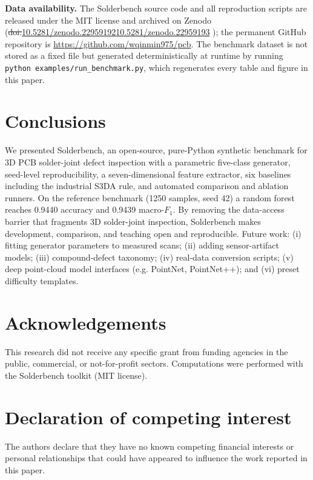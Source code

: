 \documentclass[3p]{elsarticle}
\makeatletter
\providecommand{\DIFaddtex}[1]{{\protect\color{blue}\uwave{#1}}} %
\providecommand{\DIFdeltex}[1]{{\protect\color{red}\sout{#1}}} %
\providecommand{\DIFaddbegin}{} %
\providecommand{\DIFaddend}{} %
\providecommand{\DIFdelbegin}{} %
\providecommand{\DIFdelend}{} %
\providecommand{\DIFadd}[1]{\texorpdfstring{\DIFaddtex{#1}}{#1}} %
\providecommand{\DIFdel}[1]{\texorpdfstring{\DIFdeltex{#1}}{}} %
\providecommand{\DIFscaledelfig}{0.5}
\newlength{\DIFdelgraphicswidth} %
\newlength{\DIFdelgraphicsheight} %
\providecommand{\DIFaddincludegraphics}[2][]{{\color{blue}\fbox{\DIFOincludegraphics[#1]{#2}}}} %
\providecommand{\DIFdelincludegraphics}[2][]{%
\sbox{\DIFdelgraphicsbox}{\DIFOincludegraphics[#1]{#2}}%
\settoboxwidth{\DIFdelgraphicswidth}{\DIFdelgraphicsbox} %
\settoboxtotalheight{\DIFdelgraphicsheight}{\DIFdelgraphicsbox} %
\scalebox{\DIFscaledelfig}{%
\parbox[b]{\DIFdelgraphicswidth}{\usebox{\DIFdelgraphicsbox}\\[-\baselineskip] \rule{\DIFdelgraphicswidth}{0em}}\llap{\resizebox{\DIFdelgraphicswidth}{\DIFdelgraphicsheight}{%
\setlength{\unitlength}{\DIFdelgraphicswidth}%
\begin{picture}(1,1)%
\thicklines\linethickness{2pt} %
{\color[rgb]{1,0,0}\put(0,0){\framebox(1,1){}}}%
{\color[rgb]{1,0,0}\put(0,0){\line( 1,1){1}}}%
{\color[rgb]{1,0,0}\put(0,1){\line(1,-1){1}}}%
\end{picture}%
}\hspace*{3pt}}} %
} %
\DeclareRobustCommand{\DIFaddbegin}{\DIFOaddbegin \let\includegraphics\DIFaddincludegraphics} %
\DeclareRobustCommand{\DIFaddend}{\DIFOaddend \let\includegraphics\DIFOincludegraphics} %
\DeclareRobustCommand{\DIFdelbegin}{\DIFOdelbegin \let\includegraphics\DIFdelincludegraphics} %
\DeclareRobustCommand{\DIFdelend}{\DIFOaddend \let\includegraphics\DIFOincludegraphics} %
\let\sout@orig\sout %
\renewcommand{\sout}[1]{\ifmmode\text{\sout@orig{\ensuremath{#1}}}\else\sout@orig{#1}\fi} %
\makeatother
\begin{document}
\begin{sloppypar}\noindent\textbf{Data availability.} The Solderbench source code and all reproduction scripts are released under the MIT license and archived on Zenodo (\DIFdelbegin \DIFdel{doi:}\DIFdelend \DIFaddbegin \DIFadd{concept doi:}\url{10.5281/zenodo.22959192}\DIFadd{, version doi:}\DIFaddend \url{10.5281/zenodo.22959193} \DIFaddbegin \DIFadd{for v0.1.1}\DIFaddend ); the permanent GitHub repository is \url{https://github.com/wqinmin975/pcb}. The benchmark dataset is not stored as a fixed file but generated deterministically at runtime by running \texttt{python examples/run\_benchmark.py}, which regenerates every table and figure in this paper.\end{sloppypar}

\section{Conclusions}
We presented Solderbench, an open-source, pure-Python synthetic benchmark for 3D PCB solder-joint defect inspection with a parametric five-class generator, seed-level reproducibility, a seven-dimensional feature extractor, six baselines including the industrial S3DA rule, and automated comparison and ablation runners. On the reference benchmark (1250 samples, seed 42) a random forest reaches 0.9440 accuracy and 0.9439 macro-$F_1$. By removing the data-access barrier that fragments 3D solder-joint inspection, Solderbench makes development, comparison, and teaching open and reproducible. Future work: (i) fitting generator parameters to measured scans; (ii) adding sensor-artifact models; (iii) compound-defect taxonomy; (iv) real-data conversion scripts; (v) deep point-cloud model interfaces (e.g. PointNet, PointNet++); and (vi) preset difficulty templates.
\section{Acknowledgements}
This research did not receive any specific grant from funding agencies in the public, commercial, or not-for-profit sectors. Computations were performed with the Solderbench toolkit (MIT license).

\section*{Declaration of competing interest}
The authors declare that they have no known competing financial interests or personal relationships that could have appeared to influence the work reported in this paper.
\end{document}
